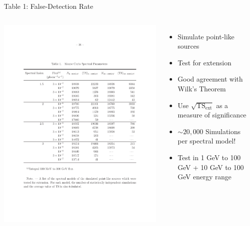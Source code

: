 \documentclass[12pt]{beamer}
\begin{document}
\begin{frame}{Table 1: False-Detection Rate}
  \begin{columns}
    \includegraphics[scale=0.35]{plots/table_1.pdf}
    \begin{itemize}
      \item Simulate point-like sources
      \item Test for extension
      \item Good agreement with Wilk's Theorem
      \item Use $\sqrt{\mathrm{TS}_\mathrm{ext}}$
        as a measure of significance
      \item $\sim 20,000$ Simulations per spectral model!
      \item Test in 1 GeV to 100 GeV + 10 GeV to 100 GeV
        energy range
    \end{itemize}
  \end{columns}
\end{frame}
\end{document}
